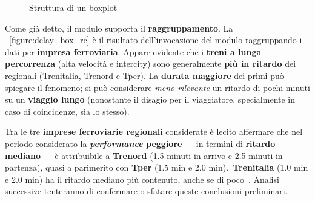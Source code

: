 \documentclass[12pt,italian]{report}
\begin{document}
\begin{figure}[h] \centering
    \caption{Struttura di un boxplot}
    \label{figure:boxplot}
\end{figure}

Come già detto, il modulo supporta il \textbf{raggruppamento}.  La
\figurename~\ref{figure:delay_box_rc} è il risultato dell'invocazione
del modulo raggruppando i dati per \textbf{impresa ferroviaria}.
Appare evidente che i \textbf{treni a lunga percorrenza} (alta
velocità e intercity) sono generalmente \textbf{più in ritardo} dei
regionali (Trenitalia, Trenord e Tper).  La \textbf{durata maggiore}
dei primi può spiegare il fenomeno; si può considerare \textit{meno
    rilevante} un ritardo di pochi minuti su un \textbf{viaggio lungo}
(nonostante il disagio per il viaggiatore, specialmente in caso di
coincidenze, sia lo stesso).

Tra le tre \textbf{imprese ferroviarie regionali} considerate è lecito
affermare che nel periodo considerato la \textbf{\textit{performance}
    peggiore} --- in termini di \textbf{ritardo mediano} --- è
attribuibile a \textbf{Trenord} (1.5 minuti in arrivo e 2.5 minuti in
partenza), quasi a parimerito con \textbf{Tper} (1.5 min e 2.0
min).\@~\textbf{Trenitalia} (1.0 min e 2.0 min) ha il ritardo mediano
più contenuto, anche se di poco~\cite[C]{StatJup}.  Analisi successive
tenteranno di confermare o sfatare queste conclusioni preliminari.
\end{document}
